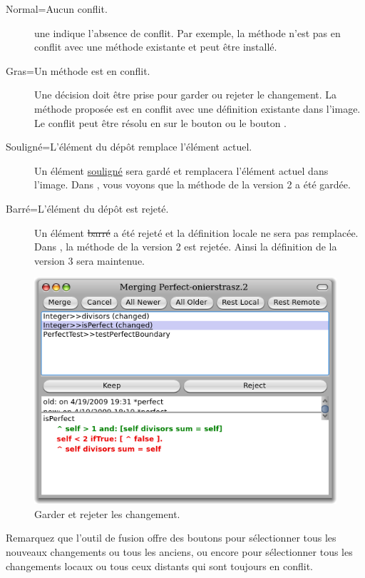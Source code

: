 \documentclass[a4paper,10pt,twoside]{book}
\begin{document}
\begin{description}
\item[Normal=Aucun conflit.] une  indique
  l'absence de conflit. Par exemple, la méthode
   n'est pas en conflit avec une
  méthode existante et peut être installé.
\item[Gras=Un méthode est en conflit.] Une décision doit être prise
  pour garder ou rejeter le changement. La méthode proposée
 est en conflit avec une définition existante
dans l'image. Le conflit peut être résolu en \clickant{} sur le bouton 
  ou le bouton .
\item[Souligné=L'élément du dépôt remplace l'élément actuel.] Un
  élément \underline{souligné} sera gardé et remplacera l'élément
  actuel dans l'image. Dans , vous voyons que la
  méthode   de la version 2 a été gardée.
\item[Barré=L'élément du dépôt est rejeté.] Un élément \sout{barré} a
  été rejeté et la définition locale ne sera pas remplacée.
 Dans , la méthode  de la
 version 2 est rejetée. Ainsi la définition de la version 3 sera
 maintenue.
\end{description}

\begin{figure}[ht]\centering
	\includegraphics[width=.8\textwidth]{keepReject}
	\caption{Garder et rejeter les changement.
	}
\end{figure}

Remarquez que l'outil de fusion offre des boutons pour sélectionner
tous les nouveaux changements ou tous les anciens, ou encore pour
sélectionner tous les changements locaux ou tous ceux distants qui
sont toujours en conflit.
\end{document}
